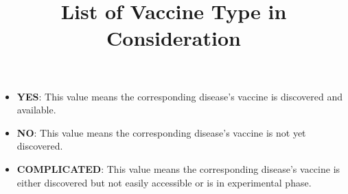 \documentclass{article}
\title{List of Vaccine Type in Consideration}
\date{}
\begin{document}
\maketitle
\begin{itemize}
    \item \textbf{YES}: This value means the corresponding disease's vaccine is discovered and available.
    \item \textbf{NO}: This value means the corresponding disease's vaccine is not yet discovered.
    \item \textbf{COMPLICATED}: This value means the corresponding disease's vaccine is either discovered but not easily accessible or is in 
                      experimental phase.
  \end{itemize}
  
\end{document}
